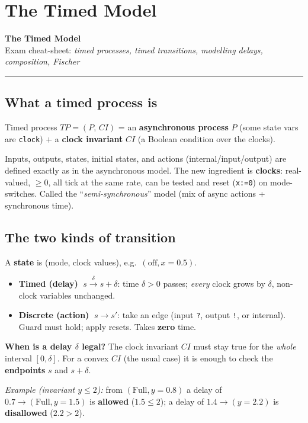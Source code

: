 \chapter{The Timed Model}


\begin{center}
{\Large\bfseries The Timed Model}\\[1pt]
{\small Exam cheat-sheet: \emph{timed processes, timed transitions, modelling delays, composition, Fischer}}
\end{center}
\hrule
\vspace{4pt}

\section{What a timed process is}
\begin{keybox}
\centering Timed process $TP=(P,\,CI)$ = an \textbf{asynchronous process} $P$ (some state vars are \texttt{clock}) $+$ a \textbf{clock invariant} $CI$ (a Boolean condition over the clocks).
\end{keybox}
Inputs, outputs, states, initial states, and actions (internal/input/output) are defined exactly as in the asynchronous model. The new ingredient is \textbf{clocks}: real-valued, $\ge0$, all tick at the same rate, can be tested and reset (\texttt{x:=0}) on mode-switches. Called the ``\emph{semi-synchronous}'' model (mix of async actions + synchronous time).

\section{The two kinds of transition}
A \textbf{state} is (mode, clock values), e.g.\ $(\text{off},x{=}0.5)$.
\begin{itemize}
\item \textbf{Timed (delay)} $\;s\xrightarrow{\;\delta\;}s{+}\delta$: time $\delta>0$ passes; \emph{every} clock grows by $\delta$, non-clock variables unchanged.
\item \textbf{Discrete (action)} $\;s\to s'$: take an edge (input \texttt{?}, output \texttt{!}, or internal). Guard must hold; apply resets. Takes \textbf{zero} time.
\end{itemize}
\begin{keybox}
\textbf{When is a delay $\delta$ legal?} The clock invariant $CI$ must stay true for the \emph{whole} interval $[0,\delta]$. For a convex $CI$ (the usual case) it is enough to check the \textbf{endpoints} $s$ and $s{+}\delta$.
\end{keybox}
\textit{Example (invariant $y\le2$):} from $(\text{Full},y{=}0.8)$ a delay of $0.7\to(\text{Full},y{=}1.5)$ is \textbf{allowed} ($1.5\le2$); a delay of $1.4\to(y{=}2.2)$ is \textbf{disallowed} ($2.2>2$).

